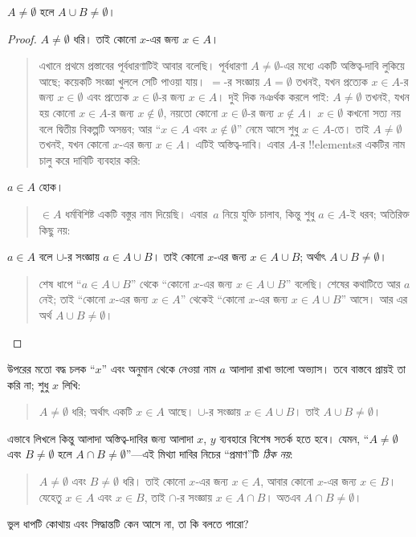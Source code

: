 \documentclass[../../../include/open-logic-section]{subfiles}
\begin{document}
\begin{prop}
$A \neq \emptyset$ হলে $A \cup B \neq \emptyset$।
\end{prop}

\begin{proof}
  $A \neq \emptyset$ ধরি। তাই কোনো $x$-এর জন্য
  $x \in A$।
  \begin{quote}
    এখানে প্রথমে প্রস্তাবের পূর্বধারণাটিই আবার বলেছি।
    পূর্বধারণা $A \neq \emptyset$-এর মধ্যে একটি
    অস্তিত্ব-দাবি লুকিয়ে আছে; কয়েকটি সংজ্ঞা খুললে
    সেটি পাওয়া যায়। $=$-র সংজ্ঞায় $A = \emptyset$
    তখনই, যখন প্রত্যেক $x \in A$-র জন্য
    $x \in \emptyset$ এবং প্রত্যেক $x \in
    \emptyset$-র জন্য $x \in A$। দুই দিক নঞর্থক
    করলে পাই: $A \neq \emptyset$ তখনই, যখন
    হয় কোনো $x \in A$-র জন্য $x \notin \emptyset$,
    নয়তো কোনো $x \in \emptyset$-র জন্য
    $x \notin A$। $x \in \emptyset$ কখনো সত্য নয় বলে
    দ্বিতীয় বিকল্পটি অসম্ভব; আর ``$x \in A$ এবং
    $x \notin \emptyset$'' নেমে আসে শুধু
    $x \in A$-তে। তাই
    $A \neq \emptyset$ তখনই, যখন কোনো $x$-এর
    জন্য $x \in A$। এটিই অস্তিত্ব-দাবি। এবার
    $A$-র !!{element}sর একটির নাম চালু করে
    দাবিটি ব্যবহার করি:
  \end{quote}
  $a \in A$ হোক।
  \begin{quote}
    $\in A$ ধর্মবিশিষ্ট একটি বস্তুর নাম দিয়েছি।
    এবার~$a$ নিয়ে যুক্তি চালাব, কিন্তু শুধু
    $a \in A$-ই ধরব; অতিরিক্ত কিছু নয়:
  \end{quote}
  $a \in A$ বলে $\cup$-র সংজ্ঞায়
  $a \in A \cup B$। তাই কোনো $x$-এর জন্য
  $x \in A \cup B$; অর্থাৎ $A \cup B \neq \emptyset$।
  \begin{quote}
    শেষ ধাপে ``$a \in A \cup B$'' থেকে
    ``কোনো $x$-এর জন্য $x \in A \cup B$'' বলেছি।
    শেষের কথাটিতে আর $a$ নেই; তাই ``কোনো $x$-এর
    জন্য $x \in A$'' থেকেই ``কোনো $x$-এর জন্য
    $x \in A \cup B$'' আসে। আর এর অর্থ
    $A \cup B \neq \emptyset$।
  \end{quote}
\end{proof}

উপরের মতো বদ্ধ চলক ``$x$'' এবং অনুমান থেকে
নেওয়া নাম $a$ আলাদা রাখা ভালো অভ্যাস। তবে
বাস্তবে প্রায়ই তা করি না; শুধু $x$ লিখি:
\begin{quote}
$A \neq \emptyset$ ধরি; অর্থাৎ একটি $x \in A$
আছে। $\cup$-র সংজ্ঞায় $x \in A \cup B$।
তাই $A \cup B \neq \emptyset$।
\end{quote}
এভাবে লিখলে কিন্তু আলাদা অস্তিত্ব-দাবির জন্য আলাদা
$x$, $y$ ব্যবহারে বিশেষ সতর্ক হতে হবে। যেমন,
``$A \neq \emptyset$ এবং $B \neq \emptyset$ হলে
$A \cap B \neq \emptyset$''—এই মিথ্যা দাবির
নিচের ``প্রমাণ''টি \emph{ঠিক নয়}:
\begin{quote}
$A \neq \emptyset$ এবং $B \neq \emptyset$ ধরি।
তাই কোনো $x$-এর জন্য $x \in A$, আবার কোনো
$x$-এর জন্য $x \in B$। যেহেতু $x \in A$
এবং $x \in B$, তাই $\cap$-র সংজ্ঞায়
$x \in A \cap B$। অতএব $A \cap B \neq
\emptyset$।
\end{quote}
ভুল ধাপটি কোথায় এবং সিদ্ধান্তটি কেন আসে না,
তা কি বলতে পারো?
\end{document}
